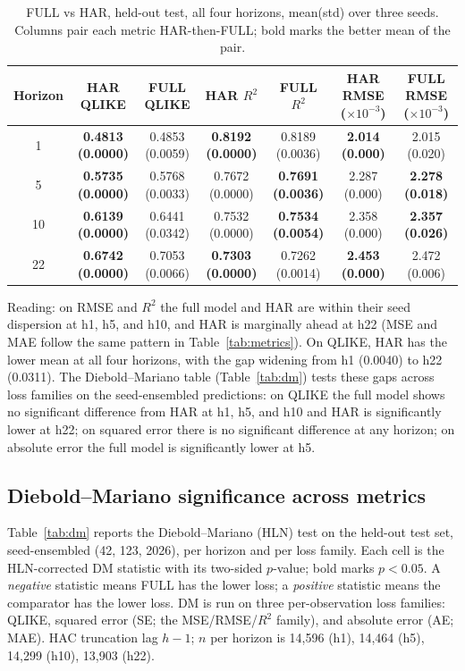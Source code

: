 \documentclass[runningheads]{llncs}
\begin{document}
\begin{table}[t]
\caption{FULL vs HAR, held-out test, all four horizons, mean(std) over three seeds. Columns pair each
metric HAR-then-FULL; bold marks the better mean of the pair.}
\label{tab:fullhar}
\centering
\begin{tabular}{ccccccc}
\toprule
Horizon & HAR QLIKE & FULL QLIKE & HAR $R^2$ & FULL $R^2$
 & HAR RMSE ($\times10^{-3}$) & FULL RMSE ($\times10^{-3}$) \\
\midrule
1  & \textbf{0.4813 (0.0000)} & 0.4853 (0.0059) & \textbf{0.8192 (0.0000)} & 0.8189 (0.0036) & \textbf{2.014 (0.000)} & 2.015 (0.020) \\
5  & \textbf{0.5735 (0.0000)} & 0.5768 (0.0033) & 0.7672 (0.0000) & \textbf{0.7691 (0.0036)} & 2.287 (0.000) & \textbf{2.278 (0.018)} \\
10 & \textbf{0.6139 (0.0000)} & 0.6441 (0.0342) & 0.7532 (0.0000) & \textbf{0.7534 (0.0054)} & 2.358 (0.000) & \textbf{2.357 (0.026)} \\
22 & \textbf{0.6742 (0.0000)} & 0.7053 (0.0066) & \textbf{0.7303 (0.0000)} & 0.7262 (0.0014) & \textbf{2.453 (0.000)} & 2.472 (0.006) \\
\bottomrule
\end{tabular}
\end{table}

Reading: on RMSE and $R^2$ the full model and HAR are within their seed dispersion at h1, h5, and h10, and
HAR is marginally ahead at h22 (MSE and MAE follow the same pattern in Table~\ref{tab:metrics}). On QLIKE,
HAR has the lower mean at all four horizons, with the gap widening from h1 (0.0040) to h22 (0.0311). The
Diebold--Mariano table (Table~\ref{tab:dm}) tests these gaps across loss families on the seed-ensembled
predictions: on QLIKE the full model shows no significant difference from HAR at h1, h5, and h10 and HAR is
significantly lower at h22; on squared error there is no significant difference at any horizon; on absolute
error the full model is significantly lower at h5.

\subsection{Diebold--Mariano significance across metrics}
\label{sec:results-dm}
Table~\ref{tab:dm} reports the Diebold--Mariano (HLN) test on the held-out test set, seed-ensembled
(42, 123, 2026), per horizon and per loss family. Each cell is the HLN-corrected DM statistic with its
two-sided $p$-value; bold marks $p<0.05$. A \emph{negative} statistic means FULL has the lower loss; a
\emph{positive} statistic means the comparator has the lower loss. DM is run on three per-observation loss
families: QLIKE, squared error (SE; the MSE/RMSE/$R^2$ family), and absolute error (AE; MAE). HAC
truncation lag $h{-}1$; $n$ per horizon is 14{,}596 (h1), 14{,}464 (h5), 14{,}299 (h10), 13{,}903 (h22).
\end{document}
